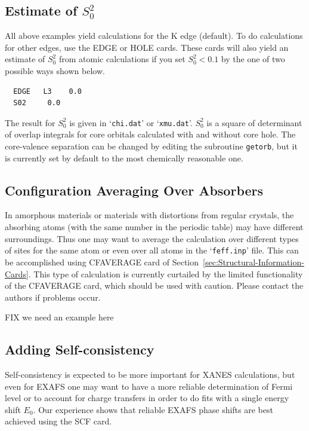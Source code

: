 \documentclass[11pt,oneside]{report} %
\renewcommand{\htmlref}[2]{\hyperlink{#2}{#1}}
\newcommand{\file}[1]{`\texttt{#1}'}
\renewcommand{\htmlref}[2]{{#1}} %
\begin{document}
\subsection{Estimate of $S_0^2$}
\label{sec:S02-estimate}
All above examples yield calculations for the K edge (default). To do
calculations for other edges, use the \htmlref{EDGE}{card:edg} or 
\htmlref{HOLE}{card:hol} cards. These cards
will also yield an estimate of $S_0^2$ from atomic calculations if you
set $S_0^2<0.1$ by the one of two possible ways shown below.
\begin{verbatim}
  EDGE   L3    0.0
  S02     0.0
\end{verbatim}

The result for $S_0^2$ is given in \file{chi.dat} or \file{xmu.dat}.
$S_0^2$ is a square of determinant of overlap integrals for core
orbitals calculated with and without core hole. The core-valence
separation can be changed by editing the subroutine \texttt{getorb}, but
it is currently set by default to the most chemically reasonable one.


\subsection{Configuration Averaging Over Absorbers}
\label{sec:Aver-over-absorb}
In amorphous materials or materials with distortions from regular
crystals, the absorbing atoms (with the same number in the periodic table)
may have different surroundings. Thus one may want to average the
calculation over different types of sites for the same atom or even
over all atoms in the \file{feff.inp} file. This can be accomplished using
\htmlref{CFAVERAGE}{card:cfa} card of Section~\ref{sec:Structural-Information-Cards}.
This type of calculation is currently curtailed by 
the limited functionality of the CFAVERAGE card, which should be used 
with caution.  Please contact the authors if problems occur.

FIX we need an example here


\subsection{Adding Self-consistency}
\label{sec:Adding-self-cons}
Self-consistency is expected to be more important for XANES
calculations, but even for EXAFS one may want to have a more reliable
determination of Fermi level or to account for charge transfers in
order to do fits with a single energy shift $E_0$. Our experience shows
that reliable EXAFS phase shifts are best achieved using the 
\htmlref{SCF}{card:scf} card.
\end{document}
